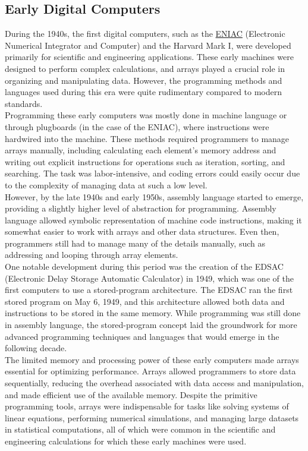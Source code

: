 \documentclass[12pt, oneside]{book}
\begin{document}
\subsection{Early Digital Computers}
During the 1940s, the first digital computers, such as the \href{https://en.wikipedia.org/wiki/ENIAC}{ENIAC} (Electronic Numerical Integrator and Computer) and the Harvard Mark I, were developed primarily for scientific and engineering applications. These early machines were designed to perform complex calculations, and arrays played a crucial role in organizing and manipulating data. However, the programming methods and languages used during this era were quite rudimentary compared to modern standards.\\Programming these early computers was mostly done in machine language or through plugboards (in the case of the ENIAC), where instructions were hardwired into the machine. These methods required programmers to manage arrays manually, including calculating each element's memory address and writing out explicit instructions for operations such as iteration, sorting, and searching. The task was labor-intensive, and coding errors could easily occur due to the complexity of managing data at such a low level.\\However, by the late 1940s and early 1950s, assembly language started to emerge, providing a slightly higher level of abstraction for programming. Assembly language allowed symbolic representation of machine code instructions, making it somewhat easier to work with arrays and other data structures. Even then, programmers still had to manage many of the details manually, such as addressing and looping through array elements.\\One notable development during this period was the creation of the EDSAC (Electronic Delay Storage Automatic Calculator) in 1949, which was one of the first computers to use a stored-program architecture. The EDSAC ran the first stored program on May 6, 1949, and this architecture allowed both data and instructions to be stored in the same memory. While programming was still done in assembly language, the stored-program concept laid the groundwork for more advanced programming techniques and languages that would emerge in the following decade.\\The limited memory and processing power of these early computers made arrays essential for optimizing performance. Arrays allowed programmers to store data sequentially, reducing the overhead associated with data access and manipulation, and made efficient use of the available memory. Despite the primitive programming tools, arrays were indispensable for tasks like solving systems of linear equations, performing numerical simulations, and managing large datasets in statistical computations, all of which were common in the scientific and engineering calculations for which these early machines were used.
	
\end{document}
